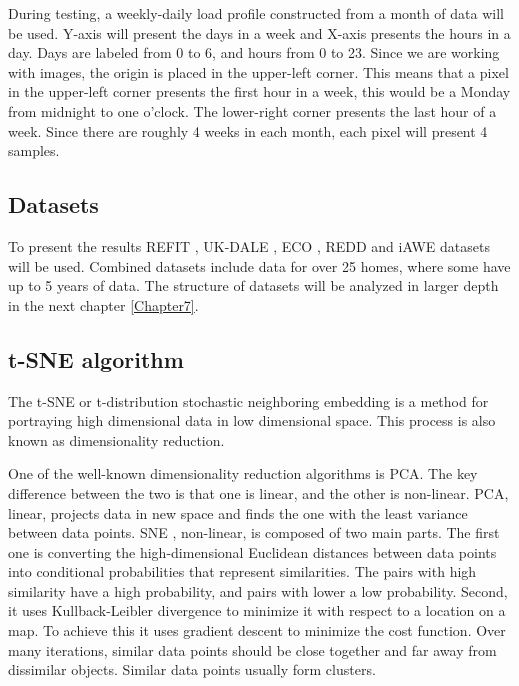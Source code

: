 During testing, a weekly-daily load profile constructed from a month of data will be used.
Y-axis will present the days in a week and X-axis presents the hours in a day.
Days are labeled from 0 to 6, and hours from 0 to 23.
Since we are working with images, the origin is placed in the upper-left corner. 
This means that a pixel in the upper-left corner presents the first hour in a week,
this would be a Monday from midnight to one o'clock. 
The lower-right corner presents the last hour of a week.
Since there are roughly 4 weeks in each month, each pixel will present 4 samples. 

\subsection{Datasets}

To present the results REFIT \cite{REFIT}, UK-DALE \cite{UKDALE}, ECO \cite{ECO}, REDD \cite{REDD} and iAWE \cite{iAWE} datasets will be used.
Combined datasets include data for over 25 homes, where some have up to 5 years of data. 
The structure of datasets will be analyzed in larger depth in the next chapter \ref{Chapter7}. 

\subsection{t-SNE algorithm}

The t-SNE \cite{tsne2} or t-distribution stochastic neighboring embedding is a method for portraying high dimensional 
data in low dimensional space. This process is also known as dimensionality reduction.

One of the well-known dimensionality reduction algorithms is PCA.
The key difference between the two is that one is linear, and the other is non-linear.
PCA, linear, projects data in new space and finds the one with the least variance between data points.
SNE \cite{sne1}, non-linear, is composed of two main parts. The first one is 
converting the high-dimensional Euclidean distances between data points into conditional probabilities that represent similarities. \cite{sne1}
The pairs with high similarity have a high probability, and pairs with lower a low probability.
Second, it uses Kullback-Leibler divergence to minimize it with respect to a location on a map.
To achieve this it uses gradient descent to minimize the cost function.
Over many iterations, similar data points should be close together and far away from dissimilar objects.
Similar data points usually form clusters.

